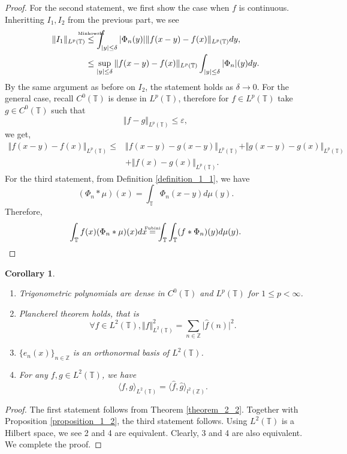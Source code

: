 \documentclass[8pt]{article}
\newtheorem{corollary}{Corollary} [section]
\newcommand{\ztext}[1]{\text{\makebox[0pt][c]{\tiny #1}}}
\newcommand{\norm}[1]{\Vert #1 \Vert}
\newcommand{\ab}[1]{\vert #1 \vert}
\newcommand{\bZ}[0]{\mathbb{Z}}
\newcommand{\bT}[0]{\mathbb{T}}
\begin{document}
\begin{proof}
  \par For the second statement, we first show the case when $f$ is continuous. Inheritting $I_1,I_2$ from the previous part, we see 
  \begin{align*}
    \norm{I_1}_{L^p(\bT)} &\stackrel{\ztext{Minkowski}}{\leq}\int_{\ab{y}\leq \delta}\ab{\Phi_n(y)}\norm{f(x-y)-f(x)}_{L^p(\bT)}dy,\\
    & \leq \sup_{\ab{y}\leq \delta}\norm{f(x-y)-f(x)}_{L^p(\bT)}\int_{\ab{y}\leq\delta}\ab{\Phi_n}(y)dy.
  \end{align*}
  By the same argument as before on $I_2$, the statement holds as $\delta\to0$. For the general case, recall $C^0(\bT)$ is dense in $L^p(\bT)$, therefore for $f\in L^p(\bT)$ take $g\in C^0(\bT)$ such that 
  \begin{equation*}
    \norm{f-g}_{L^p(\bT)}\leq \varepsilon,
  \end{equation*}
  we get,
  \begin{align*}
    \norm{f(x-y)-f(x)}_{L^p(\bT)}\leq& \norm{f(x-y)-g(x-y)}_{L^p(\bT)}+\norm{g(x-y)-g(x)}_{L^p(\bT)}\\
    &+\norm{f(x)-g(x)}_{L^p(\bT)}.
  \end{align*}
  For the third statement, from Definition \ref{definition_1_1}, we have 
  \begin{equation*}
    (\Phi_n\ast\mu)(x) = \int_\bT\Phi_n(x-y)d\mu(y).
  \end{equation*}
  Therefore,
  \begin{equation*}
    \int_\bT f(x)(\Phi_n\ast\mu)(x)dx \stackrel{\ztext{Fubini}}{=}\int_\bT\int_\bT (f\ast\Phi_n)(y)d\mu(y).
  \end{equation*}
\end{proof}

\begin{corollary}$\:$
  \label{corollary_2_1}
  \begin{enumerate}[1. ]
    \item Trigonometric polynomials are dense in $C^0(\bT)$ and $L^p(\bT)$ for $1\leq p<\infty$.
    \item Plancherel theorem holds, that is  
    \begin{equation*}
      \forall f\in L^2(\bT), \norm{f}_{L^2(\bT)}^2 = \sum_{n\in\bZ}\ab{\hat{f}(n)}^2.
    \end{equation*}
    \item $\{e_n(x)\}_{n\in\bZ}$ is an orthonormal basis of $L^2(\bT)$.
    \item For any $f,g\in L^2(\bT)$, we have 
    \begin{equation*}
      \langle f,g\rangle_{L^2(\bT)} = \langle \hat{f},\hat{g}\rangle_{l^2(\bZ)}.
    \end{equation*}
  \end{enumerate}
\end{corollary}
\begin{proof}
  The first statement follows from Theorem \ref{theorem_2_2}. Together with Proposition \ref{proposition_1_2}, the third statement follows. Using $L^2(\bT)$ is a Hilbert space, we see 2 and 4 are equivalent. Clearly, 3 and 4 are also equivalent. We complete the proof.
\end{proof}
\end{document}
